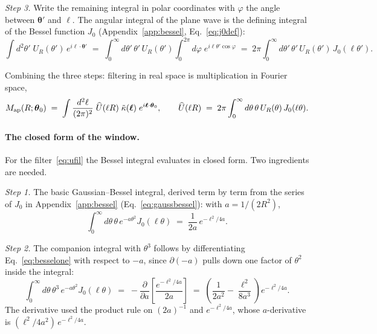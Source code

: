 \documentclass[11pt]{article}
\newcommand{\Map}{M_{\rm ap}}
\newcommand{\Ufil}{U_R}
\newcommand{\Uhat}{\widehat{U}}
\newcommand{\btheta}{\boldsymbol{\theta}}
\newcommand{\bell}{\boldsymbol{\ell}}
\numberwithin{equation}{section}
\begin{document}
\emph{Step 3.}  Write the remaining integral in polar coordinates
with $\varphi$ the angle between $\btheta'$ and $\bell$.  The
angular integral of the plane wave is the defining integral of the
Bessel function $J_0$ (Appendix~\ref{app:bessel},
Eq.~\eqref{eq:j0def}):
\begin{equation}
  \int d^2\theta'\; \Ufil(\theta')\, e^{i\bell\cdot\btheta'}
  \;=\;
  \int_0^\infty d\theta'\,\theta'\, \Ufil(\theta')
  \int_0^{2\pi} d\varphi\; e^{i\ell\theta'\cos\varphi}
  \;=\;
  2\pi \int_0^\infty d\theta'\,\theta'\,
  \Ufil(\theta')\, J_0(\ell\theta') .
  \label{eq:winstep3}
\end{equation}

Combining the three steps: filtering in real space is multiplication
in Fourier space,
\begin{equation}
  \Map(R;\btheta_0)
  \;=\; \int \frac{d^2\ell}{(2\pi)^2}\;
  \Uhat(\ell R)\;\tilde\kappa(\bell)\;
  e^{i\bell\cdot\btheta_0},
  \qquad
  \Uhat(\ell R) \;=\; 2\pi \int_0^\infty d\theta\,\theta\,
  \Ufil(\theta)\, J_0(\ell\theta) .
  \label{eq:mapfourier}
\end{equation}

\paragraph{The closed form of the window.}
For the filter~\eqref{eq:ufil} the Bessel integral evaluates in
closed form.  Two ingredients are needed.

\emph{Step 1.}  The basic Gaussian--Bessel integral, derived term by
term from the series of $J_0$ in Appendix~\ref{app:bessel}
(Eq.~\eqref{eq:gaussbessel}): with $a = 1/(2R^2)$,
\begin{equation}
  \int_0^\infty d\theta\,\theta\, e^{-a\theta^2} J_0(\ell\theta)
  \;=\; \frac{1}{2a}\, e^{-\ell^2/4a} .
  \label{eq:besselone}
\end{equation}

\emph{Step 2.}  The companion integral with $\theta^3$ follows by
differentiating Eq.~\eqref{eq:besselone} with respect to $-a$, since
$\partial(-a)$ pulls down one factor of $\theta^2$ inside the
integral:
\begin{equation}
  \int_0^\infty d\theta\,\theta^3\, e^{-a\theta^2} J_0(\ell\theta)
  \;=\; -\frac{\partial}{\partial a}
  \left[\frac{e^{-\ell^2/4a}}{2a}\right]
  \;=\; \left(\frac{1}{2a^2} - \frac{\ell^2}{8a^3}\right)
  e^{-\ell^2/4a} .
  \label{eq:besseltwo}
\end{equation}
The derivative used the product rule on $(2a)^{-1}$ and
$e^{-\ell^2/4a}$, whose $a$-derivative is
$(\ell^2/4a^2)\,e^{-\ell^2/4a}$.
\end{document}
